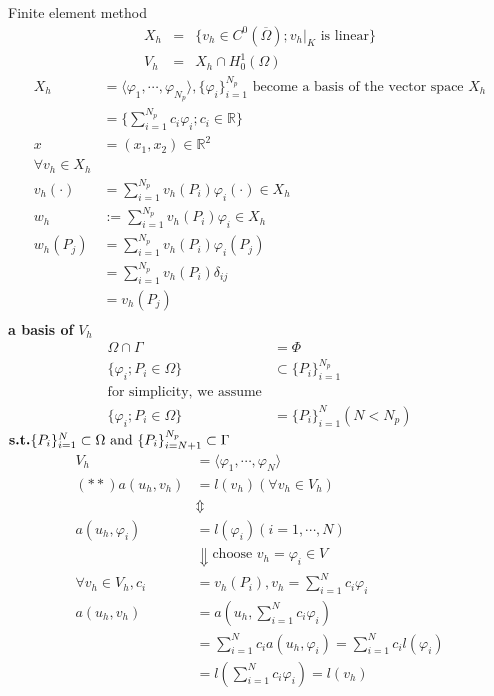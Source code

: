 \documentclass[]{report}
\newcommand{\R}{\mathbb{R}}
\begin{document}
Finite element method
\begin{eqnarray}\nonumber
X_{h} &=& \{ v_{h} \in C^{0}(\overline{\Omega}) ; {v_{h}|}_{K} \text{ is linear} \} \\ \nonumber
V_{h} &=& X_{h} \cap H_{0}^{1}(\Omega)
\end{eqnarray}
\begin{align*}
X_h &= \langle \varphi_1, \cdots , \varphi_{N_p} \rangle, \{\varphi_i\}^{N_p}_{i=1} \text{ become a basis of the vector space } X_h\\
&=\{\sum_{i=1}^{N_p} c_i\varphi_i ; c_i \in \R \}\\
x &= (x_1,x_2) \in \R^2\\
\forall v_h \in X_h\\
v_h (\cdot) &= \sum_{i=1}^{N_p} v_h(P_i) \varphi_i(\cdot) \in X_h\\
w_h &:= \sum_{i=1}^{N_p} v_h(P_i) \varphi_i \in X_h\\
w_h(P_j) &= \sum_{i=1}^{N_p} v_h (P_i) \varphi_i (P_j)\\
&= \sum_{i=1}^{N_p} v_h (P_i) \delta_{ij}\\
&= v_h (P_j)\\
\end{align*}
\textbf{a basis of} $ V_h $
\begin{align*}
\Omega \cap \Gamma &= \Phi\\
\{\varphi_i ; P_i \in \Omega \} &\subset \{P_i \}_{i=1}^{N_p}\\
\text{for simplicity, we assume}\\
\{\varphi_i ; P_i \in \Omega \} &= \{P_i\}_{i=1}^N (N < N_p)
\end{align*}
$ \text{\textbf{s.t.}} \{P_i\}_{i=1}^N \subset \Omega \text{ and } \{P_i\}_{i=N+1}^{N_p} \subset \Gamma $
\begin{align*}
V_h &= \langle \varphi_1, \cdots , \varphi_N \rangle\\
(\ast \ast) a(u_h , v_h) &= l(v_h) (\forall v_h \in V_h)\\
&\Updownarrow \\
a(u_h , \varphi_i) &= l(\varphi_i) (i=1, \cdots , N)\\
&\Downarrow \text{choose } v_h = \varphi_i \in V\\
\forall v_h \in V_h, c_i &= v_h (P_i), v_h = \sum_{i=1}^{N} c_i \varphi_i \\
a(u_h,v_h) &= a(u_h,\sum_{i=1}^{N} c_i \varphi_i)\\
&=\sum_{i=1}^{N} c_i a (u_h, \varphi_i) = \sum_{i=1}^{N} c_i l(\varphi_i)\\
&= l(\sum_{i=1}^{N} c_i \varphi_i) = l(v_h)\\
\end{align*}
\end{document}
